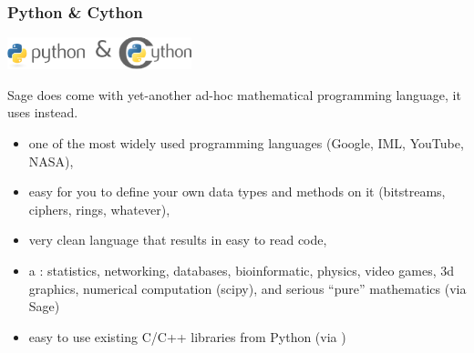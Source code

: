 \documentclass[9pt]{beamer}
\newcommand{\memph}[1]{{\color{yellow9}{\bf #1}}\xspace}
\begin{document}
\begin{frame}[fragile]
\frametitle{Python \& Cython}
\begin{block}{}
\centering
 \includegraphics[width=0.4\textwidth]{python-and-cython.png}
\end{block}

Sage does \memph{not} come with yet-another ad-hoc mathematical programming language, it uses
\memph{Python} instead.

\begin{itemize}
\item one of the most widely used programming languages (Google, IML, YouTube, NASA),
\item easy for you to define your own data types and methods on it (bitstreams, ciphers, rings, whatever),
\item very clean language that results in easy to read code,
\item a \memph{huge number of libraries}: statistics, networking, databases,
bioinformatic, physics, video games, 3d graphics, numerical computation (scipy),
and serious ``pure'' mathematics (via Sage)
\item easy to use existing C/C++ libraries from Python (via \memph{Cython})
\end{itemize}
\end{frame}
\end{document}
